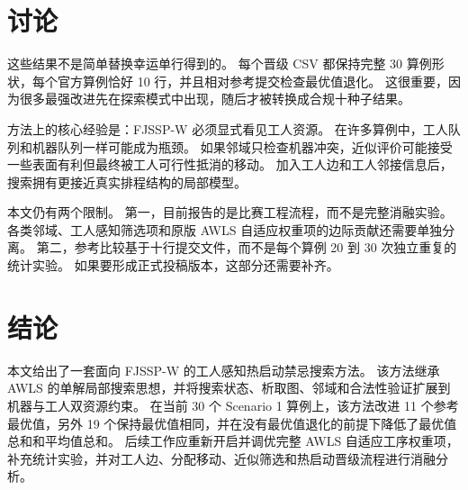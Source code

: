 \documentclass[UTF8,a4paper,zihao=-4]{ctexart}
\begin{document}
\section{讨论}
这些结果不是简单替换幸运单行得到的。
每个晋级 CSV 都保持完整 30 算例形状，每个官方算例恰好 10 行，并且相对参考提交检查最优值退化。
这很重要，因为很多最强改进先在探索模式中出现，随后才被转换成合规十种子结果。

方法上的核心经验是：FJSSP-W 必须显式看见工人资源。
在许多算例中，工人队列和机器队列一样可能成为瓶颈。
如果邻域只检查机器冲突，近似评价可能接受一些表面有利但最终被工人可行性抵消的移动。
加入工人边和工人邻接信息后，搜索拥有更接近真实排程结构的局部模型。

本文仍有两个限制。
第一，目前报告的是比赛工程流程，而不是完整消融实验。
各类邻域、工人感知筛选项和原版 AWLS 自适应权重项的边际贡献还需要单独分离。
第二，参考比较基于十行提交文件，而不是每个算例 20 到 30 次独立重复的统计实验。
如果要形成正式投稿版本，这部分还需要补齐。

\section{结论}
本文给出了一套面向 FJSSP-W 的工人感知热启动禁忌搜索方法。
该方法继承 AWLS 的单解局部搜索思想，并将搜索状态、析取图、邻域和合法性验证扩展到机器与工人双资源约束。
在当前 30 个 Scenario 1 算例上，该方法改进 11 个参考最优值，另外 19 个保持最优值相同，并在没有最优值退化的前提下降低了最优值总和和平均值总和。
后续工作应重新开启并调优完整 AWLS 自适应工序权重项，补充统计实验，并对工人边、分配移动、近似筛选和热启动晋级流程进行消融分析。



\end{document}
